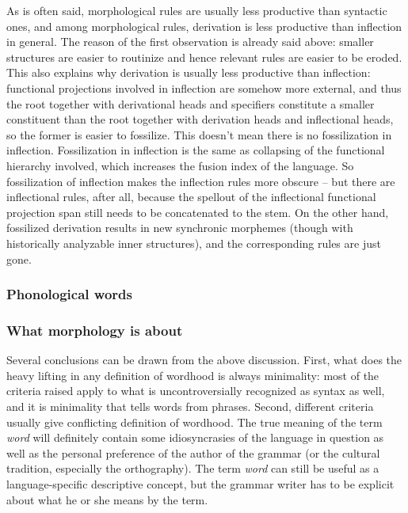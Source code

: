 \documentclass[UTF8, a4paper, oneside, scheme=plain]{ctexart}
\newcommand*{\term}[1]{\emph{#1}}
\begin{document}
As is often said, morphological rules are usually less productive than syntactic ones,
and among morphological rules,
derivation is less productive than inflection in general.
The reason of the first observation is already said above:
smaller structures are easier to routinize 
and hence relevant rules are easier to be eroded.
This also explains why derivation is usually less productive than inflection:
functional projections involved in inflection are somehow more external,
and thus the root together with derivational heads and specifiers
constitute a smaller constituent than 
the root together with derivation heads and inflectional heads,
so the former is easier to fossilize.
This doesn't mean there is no fossilization in inflection.
Fossilization in inflection is the same as collapsing of the functional hierarchy involved,
which increases the fusion index of the language.
So fossilization of inflection makes the inflection rules more obscure 
-- but there are inflectional rules, after all,
because the spellout of the inflectional functional projection span 
still needs to be concatenated to the stem.
On the other hand, 
fossilized derivation results in new synchronic morphemes 
(though with historically analyzable inner structures),
and the corresponding rules are just gone.

\subsubsection{Phonological words}\label{sec:phonological-word}

\subsubsection{What morphology is about}\label{sec:morphology-coverage}

Several conclusions can be drawn from the above discussion.
First, what does the heavy lifting in any definition of wordhood 
is always minimality:
most of the criteria raised apply to what is uncontroversially recognized as syntax as well,
and it is minimality that tells words from phrases.
Second, different criteria usually give conflicting definition of wordhood.
The true meaning of the term \term{word}
will definitely contain some idiosyncrasies 
of the language in question as well as the personal preference of the author of the grammar
(or the cultural tradition, especially the orthography).
The term \term{word} can still be useful as a language-specific descriptive concept,
but the grammar writer has to be explicit about what he or she means by the term.
\end{document}
